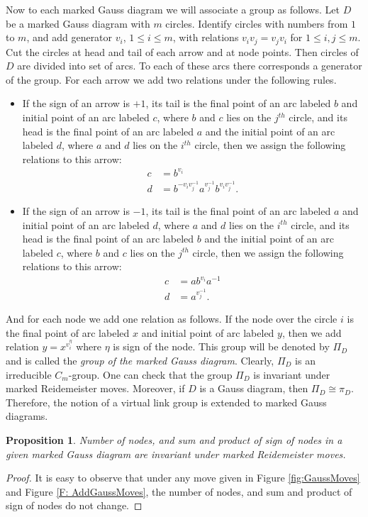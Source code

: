 \documentclass[11 pt, reqno]{amsart}
\newtheorem{proposition}[theorem]{Proposition}
\theoremstyle{definition}
\numberwithin{equation}{subsection}
\begin{document}
Now to each marked Gauss diagram we will associate a group as follows. Let $D$ be a marked Gauss diagram with $m$ circles. Identify circles with numbers from $1$ to $m$, and add generator $v_i$, $1 \leq i \leq m$, with relations $v_i v_j=v_jv_i$ for $1 \leq i, j \leq m$. Cut the circles at head and tail of each arrow and at node points. Then circles of $D$ are divided into set of arcs. To each of these arcs there corresponds a generator of the group. For each arrow we add two relations under the following rules.
\begin{itemize}
\item If the sign of an arrow is $+1$, its tail is the final point of an arc labeled $b$ and initial point of an arc labeled $c$, where $b$ and $c$ lies on the $j^{th}$ circle, and its head is the final point of an arc labeled $a$ and the initial point of an arc labeled $d$, where $a$ and $d$ lies on the $i^{th}$ circle, then we assign the following relations to this arrow:
\begin{align*}
c&=b^{v_i}\\
d&=b^{-v_i v_j ^{-1}} a^{v_j ^{-1}} b ^{v_i v_j ^{-1}}.
\end{align*}
\item If the sign of an arrow is $-1$, its tail is the final point of an arc labeled $a$ and initial point of an arc labeled $d$, where $a$ and $d$ lies on the $i^{th}$ circle, and its head is the final point of an arc labeled $b$ and the initial point of an arc labeled $c$, where $b$ and $c$ lies on the $j^{th}$ circle, then we assign the following relations to this arrow:
\begin{align*}
c&=a b ^{v_i} a^{-1}\\
d&=a^{v_j^{-1}}.
\end{align*}
\end{itemize}
And for each node we add one relation as follows. If the node over the circle $i$ is the final point of arc labeled $x$ and initial point of arc labeled $y$, then we add relation $y=x^{v_i^{\eta}}$ where $\eta$ is sign of the node. This group will be denoted by $\Pi_D$ and is called the {\it group of the marked Gauss diagram}. Clearly, $\Pi_D$ is an irreducible $C_m$-group. One can check that the group $\Pi_D$ is invariant under marked Reidemeister moves. Moreover, if $D$ is a Gauss diagram, then $\Pi_D \cong \pi_D$. Therefore, the notion of a virtual link group is extended to marked Gauss diagrams.
\par

\begin{proposition}
Number of nodes, and sum and product of sign of nodes in a given marked Gauss diagram are invariant under marked Reidemeister moves.
\end{proposition}
\begin{proof}
It is easy to observe that under any move given in Figure \ref{fig:GaussMoves} and Figure \ref{F: AddGaussMoves}, the number of nodes, and sum and product of sign of nodes do not change.
\end{proof}
\end{document}
